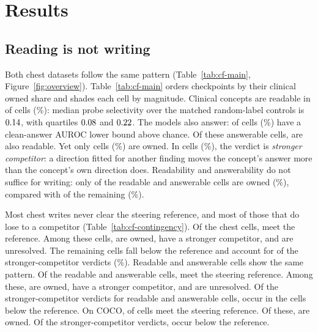\section{Results}
\label{sec:results}

\subsection{Reading is not writing}
\label{sec:headline}

Both chest datasets follow the same pattern (Table~\ref{tab:cf-main}, Figure~\ref{fig:overview}). Table~\ref{tab:cf-main} orders checkpoints by their clinical owned share and shades each cell by magnitude. Clinical concepts are readable in \cfChestReadable{} of \cfChestReadableN{} cells (\cfChestReadablePct\%): median probe selectivity over the matched random-label controls is $0.14$, with quartiles $0.08$ and $0.22$. The models also answer: \cfChestAnswerable{} of \cfChestAnswerableN{} cells (\cfChestAnswerablePct\%) have a clean-answer AUROC lower bound above chance. Of these answerable cells, \cfReadAns{} are also readable. Yet only \cfChestOwned{} cells (\cfChestOwnedPct\%) are owned. In \cfChestCompetitor{} cells (\cfChestCompetitorPct\%), the verdict is \emph{stronger competitor}: a direction fitted for another finding moves the concept's answer more than the concept's own direction does. Readability and answerability do not suffice for writing: only \cfReadAnsOwned{} of the \cfReadAns{} readable and answerable cells are owned (\cfReadAnsOwnedPct\%), compared with \cfRestOwned{} of the remaining \cfRestN{} (\cfRestOwnedPct\%).

Most chest writes never clear the steering reference, and most of those that do lose to a competitor (Table~\ref{tab:cf-contingency}). Of the \cfChestCellsN{} chest cells, \cfChestRefMet{} meet the reference. Among these \cfChestRefMet{} cells, \cfChestOwned{} are owned, \cfChestRefStrong{} have a stronger competitor, and \cfChestRefUnres{} are unresolved. The remaining \cfChestRefBelow{} cells fall below the reference and account for \cfChestBelowStrong{} of the \cfChestCompetitor{} stronger-competitor verdicts (\cfChestBelowStrongPct\%). Readable and answerable cells show the same pattern. Of the \cfReadAns{} readable and answerable cells, \cfReadAnsRefMet{} meet the steering reference. Among these, \cfReadAnsOwned{} are owned, \cfReadAnsRefStrong{} have a stronger competitor, and \cfReadAnsRefUnres{} are unresolved. Of the \cfReadAnsCompetitor{} stronger-competitor verdicts for readable and answerable cells, \cfReadAnsBelowStrong{} occur in the \cfReadAnsRefBelow{} cells below the reference. On COCO, \cfCocoRefMet{} of \cfCocoOwnedN{} cells meet the steering reference. Of these, \cfCocoOwned{} are owned. Of the \cfCocoCompetitor{} stronger-competitor verdicts, \cfCocoBelowStrong{} occur below the reference.

